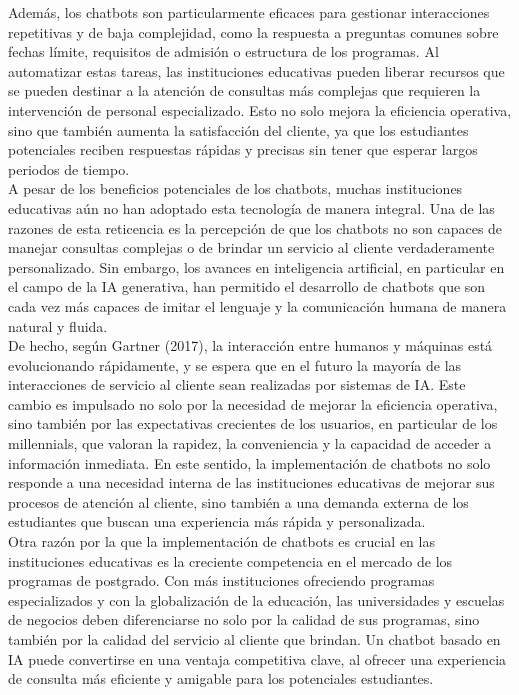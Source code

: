 \documentclass[10pt,a4paper]{article}
\begin{document}
Además, los chatbots son particularmente eficaces para gestionar interacciones repetitivas y de baja complejidad, como la respuesta a preguntas comunes sobre fechas límite, requisitos de admisión o estructura de los programas. Al automatizar estas tareas, las instituciones educativas pueden liberar recursos que se pueden destinar a la atención de consultas más complejas que requieren la intervención de personal especializado. Esto no solo mejora la eficiencia operativa, sino que también aumenta la satisfacción del cliente, ya que los estudiantes potenciales reciben respuestas rápidas y precisas sin tener que esperar largos periodos de tiempo.\\

A pesar de los beneficios potenciales de los chatbots, muchas instituciones educativas aún no han adoptado esta tecnología de manera integral. Una de las razones de esta reticencia es la percepción de que los chatbots no son capaces de manejar consultas complejas o de brindar un servicio al cliente verdaderamente personalizado. Sin embargo, los avances en inteligencia artificial, en particular en el campo de la IA generativa, han permitido el desarrollo de chatbots que son cada vez más capaces de imitar el lenguaje y la comunicación humana de manera natural y fluida.\\

De hecho, según Gartner (2017), la interacción entre humanos y máquinas está evolucionando rápidamente, y se espera que en el futuro la mayoría de las interacciones de servicio al cliente sean realizadas por sistemas de IA. Este cambio es impulsado no solo por la necesidad de mejorar la eficiencia operativa, sino también por las expectativas crecientes de los usuarios, en particular de los millennials, que valoran la rapidez, la conveniencia y la capacidad de acceder a información inmediata. En este sentido, la implementación de chatbots no solo responde a una necesidad interna de las instituciones educativas de mejorar sus procesos de atención al cliente, sino también a una demanda externa de los estudiantes que buscan una experiencia más rápida y personalizada.\\

Otra razón por la que la implementación de chatbots es crucial en las instituciones educativas es la creciente competencia en el mercado de los programas de postgrado. Con más instituciones ofreciendo programas especializados y con la globalización de la educación, las universidades y escuelas de negocios deben diferenciarse no solo por la calidad de sus programas, sino también por la calidad del servicio al cliente que brindan. Un chatbot basado en IA puede convertirse en una ventaja competitiva clave, al ofrecer una experiencia de consulta más eficiente y amigable para los potenciales estudiantes.\\
\end{document}
